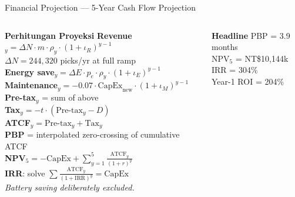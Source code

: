\documentclass[aspectratio=169,10pt]{beamer}
\begin{document}
\begin{frame}{Financial Projection --- 5-Year Cash Flow Projection}
\begin{columns}[T]
    \begin{block}{\color{boxpurple}\textbf{Perhitungan Proyeksi}}
      \tiny
      \textbf{Revenue}$_y = \Delta N \cdot m \cdot \rho_y \cdot (1{+}\iota_R)^{y-1}$\\[2pt]
      $\Delta N = 244{,}320$ picks/yr at full ramp\\[2pt]
      \textbf{Energy save}$_y = \Delta E \cdot p_e \cdot \rho_y \cdot (1{+}\iota_E)^{y-1}$\\[2pt]
      \textbf{Maintenance}$_y = -0.07 \cdot \text{CapEx}_\text{new} \cdot (1{+}\iota_M)^{y-1}$\\[3pt]
      \textbf{Pre-tax}$_y$ = sum of above\\[2pt]
      \textbf{Tax}$_y = -t \cdot (\text{Pre-tax}_y - D)$\\[2pt]
      \textbf{ATCF}$_y = \text{Pre-tax}_y + \text{Tax}_y$\\[3pt]
      \textbf{PBP} = interpolated zero-crossing of cumulative ATCF\\[2pt]
      \textbf{NPV}$_5 = -\text{CapEx} + \sum_{y=1}^{5} \frac{\text{ATCF}_y}{(1{+}r)^y}$\\[2pt]
      \textbf{IRR}: solve $\sum \frac{\text{ATCF}_y}{(1{+}\text{IRR})^y} = \text{CapEx}$\\[3pt]
      \emph{Battery saving deliberately excluded.}
    \end{block}

    \begin{block}{\color{boxblue}\textbf{Headline}}
      \scriptsize
      PBP = 3.9 months \\
      NPV$_5$ = NT\$10{,}144k \\
      IRR = 304\% \\
      Year-1 ROI = 204\%
    \end{block}
  \end{columns}
\end{frame}
\end{document}
